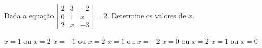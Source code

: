 Dada a equação $\left| \begin{array}{ccc}
2 & 3 & -2 \\
0 & 1 & x \\
2 & x & -3
\end{array} \right|=2$. Determine os valores de $x$.

$x=1$ ou $x=2$
$x=-1$ ou $x=2$
$x=1$ ou $x=-2$
$x=0$ ou $x=2$
$x=1$ ou $x=0$



